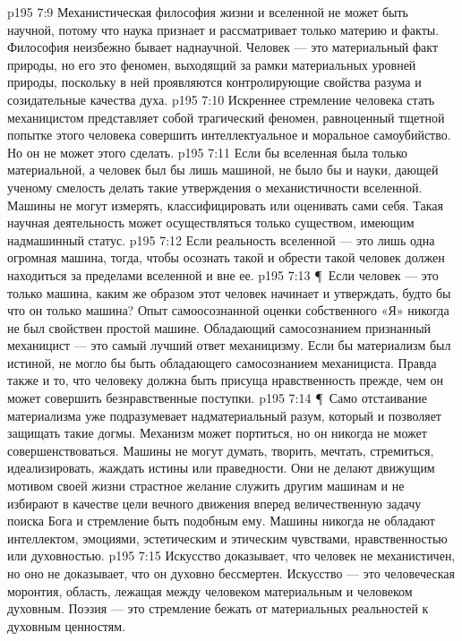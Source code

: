 \vs p195 7:9 Механистическая философия жизни и вселенной не может быть научной, потому что наука признает и рассматривает только материю и факты. Философия неизбежно бывает наднаучной. Человек --- это материальный факт природы, но его  это феномен, выходящий за рамки материальных уровней природы, поскольку в ней проявляются контролирующие свойства разума и созидательные качества духа.
\vs p195 7:10 Искреннее стремление человека стать механицистом представляет собой трагический феномен, равноценный тщетной попытке этого человека совершить интеллектуальное и моральное самоубийство. Но он не может этого сделать.
\vs p195 7:11 Если бы вселенная была только материальной, а человек был бы лишь машиной, не было бы и науки, дающей ученому смелость делать такие утверждения о механистичности вселенной. Машины не могут измерять, классифицировать или оценивать сами себя. Такая научная деятельность может осуществляться только существом, имеющим надмашинный статус.
\vs p195 7:12 Если реальность вселенной --- это лишь одна огромная машина, тогда, чтобы осознать такой  и обрести  такой  человек должен находиться за пределами вселенной и вне ее.
\vs p195 7:13 \P\ Если человек --- это только машина, каким же образом этот человек начинает  и утверждать, будто бы  что он только машина? Опыт самоосознанной оценки собственного «Я» никогда не был свойствен простой машине. Обладающий самосознанием признанный механицист --- это самый лучший ответ механицизму. Если бы материализм был истиной, не могло бы быть обладающего самосознанием механициста. Правда также и то, что человеку должна быть присуща нравственность прежде, чем он может совершить безнравственные поступки.
\vs p195 7:14 \P\ Само отстаивание материализма уже подразумевает надматериальный разум, который и позволяет защищать такие догмы. Механизм может портиться, но он никогда не может совершенствоваться. Машины не могут думать, творить, мечтать, стремиться, идеализировать, жаждать истины или праведности. Они не делают движущим мотивом своей жизни страстное желание служить другим машинам и не избирают в качестве цели вечного движения вперед величественную задачу поиска Бога и стремление быть подобным ему. Машины никогда не обладают интеллектом, эмоциями, эстетическим и этическим чувствами, нравственностью или духовностью.
\vs p195 7:15 Искусство доказывает, что человек не механистичен, но оно не доказывает, что он духовно бессмертен. Искусство --- это человеческая моронтия, область, лежащая между человеком материальным и человеком духовным. Поэзия --- это стремление бежать от материальных реальностей к духовным ценностям.
